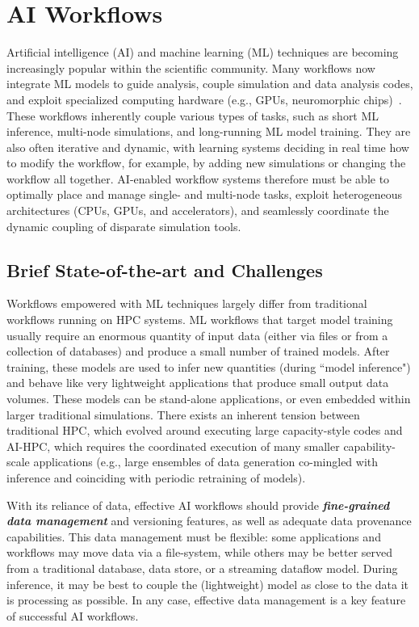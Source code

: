 \section{AI Workflows}
\label{sec:ai}

Artificial intelligence (AI) and machine learning (ML) techniques are becoming increasingly popular within the scientific community. Many workflows now integrate ML models to guide analysis, couple simulation and data analysis codes, and exploit specialized computing hardware (e.g., GPUs, neuromorphic chips)~\cite{zhou2017machine}. These workflows inherently couple various types of tasks, such as short ML inference, multi-node simulations, and long-running ML model training. They are also often iterative and dynamic, with learning systems deciding in real time how to modify the workflow, for example, by adding new simulations or changing the workflow all together. AI-enabled workflow systems therefore must be able to optimally place and manage single- and multi-node tasks, exploit heterogeneous architectures (CPUs, GPUs, and accelerators), and seamlessly coordinate the dynamic coupling of disparate simulation tools.


\subsection{Brief State-of-the-art and Challenges}

Workflows empowered with ML techniques largely differ from traditional workflows running on HPC systems. 
ML workflows that target model training usually require an enormous quantity of input data (either via files or from a collection of databases) and produce a small number of trained models. After training, these models are used to infer new quantities (during ``model inference") and behave like very lightweight applications that produce small output data volumes. These models can be stand-alone applications, or even embedded within larger traditional simulations. There exists an inherent tension between traditional HPC, which evolved around executing large capacity-style codes and AI-HPC, which requires the coordinated execution of many smaller capability-scale applications (e.g., large ensembles of data generation co-mingled with inference and coinciding with periodic retraining of models).

With its reliance of data, effective AI workflows should provide \textbf{\emph{fine-grained data management}} and versioning features, as well as adequate data provenance capabilities. This data management must be flexible: some applications and workflows may move data via a file-system, while others may be better served from a traditional database, data store, or a streaming dataflow model. During inference, it may be best to couple the (lightweight) model as close to the data it is processing as possible. In any case, effective data management is a key feature of successful AI workflows.

